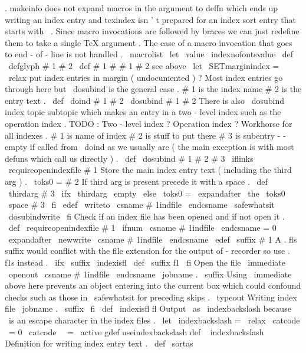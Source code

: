 {{{{{.
%
makeinfo
does
not
expand
macros
in
the
argument
to
deffn
which
ends
up
%
writing
an
index
entry
and
texindex
isn
'
t
prepared
for
an
index
sort
entry
%
that
starts
with
\
.
%
%
Since
macro
invocations
are
followed
by
braces
we
can
just
redefine
them
%
to
take
a
single
TeX
argument
.
The
case
of
a
macro
invocation
that
%
goes
to
end
-
of
-
line
is
not
handled
.
%
\
macrolist
\
let
\
value
\
indexnofontsvalue
}
\
def
\
defglyph
#
1
#
2
{
\
def
#
1
#
#
1
{
#
2
}
}
%
see
above
\
let
\
SETmarginindex
=
\
relax
%
put
index
entries
in
margin
(
undocumented
)
?
%
Most
index
entries
go
through
here
but
\
dosubind
is
the
general
case
.
%
#
1
is
the
index
name
#
2
is
the
entry
text
.
\
def
\
doind
#
1
#
2
{
\
dosubind
{
#
1
}
{
#
2
}
{
}
}
%
There
is
also
\
dosubind
{
index
}
{
topic
}
{
subtopic
}
%
which
makes
an
entry
in
a
two
-
level
index
such
as
the
operation
index
.
%
TODO
:
Two
-
level
index
?
Operation
index
?
%
Workhorse
for
all
indexes
.
%
#
1
is
name
of
index
#
2
is
stuff
to
put
there
#
3
is
subentry
-
-
%
empty
if
called
from
\
doind
as
we
usually
are
(
the
main
exception
%
is
with
most
defuns
which
call
us
directly
)
.
%
\
def
\
dosubind
#
1
#
2
#
3
{
%
\
iflinks
{
%
\
requireopenindexfile
{
#
1
}
%
%
Store
the
main
index
entry
text
(
including
the
third
arg
)
.
\
toks0
=
{
#
2
}
%
%
If
third
arg
is
present
precede
it
with
a
space
.
\
def
\
thirdarg
{
#
3
}
%
\
ifx
\
thirdarg
\
empty
\
else
\
toks0
=
\
expandafter
{
\
the
\
toks0
\
space
#
3
}
%
\
fi
%
\
edef
\
writeto
{
\
csname
#
1indfile
\
endcsname
}
%
%
\
safewhatsit
\
dosubindwrite
}
%
\
fi
}
%
Check
if
an
index
file
has
been
opened
and
if
not
open
it
.
\
def
\
requireopenindexfile
#
1
{
%
\
ifnum
\
csname
#
1indfile
\
endcsname
=
0
\
expandafter
\
newwrite
\
csname
#
1indfile
\
endcsname
\
edef
\
suffix
{
#
1
}
%
%
A
.
fls
suffix
would
conflict
with
the
file
extension
for
the
output
%
of
-
recorder
so
use
.
f1s
instead
.
\
ifx
\
suffix
\
indexisfl
\
def
\
suffix
{
f1
}
\
fi
%
Open
the
file
\
immediate
\
openout
\
csname
#
1indfile
\
endcsname
\
jobname
.
\
suffix
%
Using
\
immediate
above
here
prevents
an
object
entering
into
the
current
%
box
which
could
confound
checks
such
as
those
in
\
safewhatsit
for
%
preceding
skips
.
\
typeout
{
Writing
index
file
\
jobname
.
\
suffix
}
%
\
fi
}
\
def
\
indexisfl
{
fl
}
%
Output
\
as
{
\
indexbackslash
}
because
\
is
an
escape
character
in
%
the
index
files
.
\
let
\
indexbackslash
=
\
relax
{
\
catcode
\
=
0
\
catcode
\
\
=
\
active
gdef
useindexbackslash
{
def
\
{
{
indexbackslash
}
}
}
}
%
Definition
for
writing
index
entry
text
.
\
def
\
sortas
}}}}

